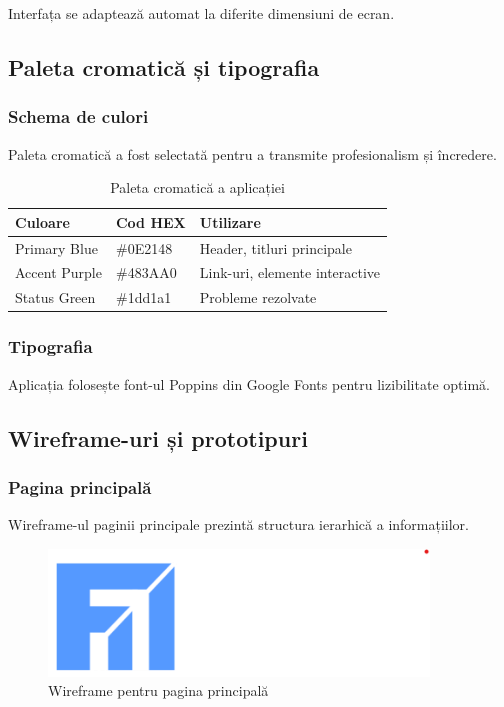 \documentclass[12pt,a4paper]{report}
\begin{document}
Interfața se adaptează automat la diferite dimensiuni de ecran.

\subsection{Paleta cromatică și tipografia}

\subsubsection{Schema de culori}

Paleta cromatică a fost selectată pentru a transmite profesionalism și încredere.

\begin{table}[H]
\centering
\caption{Paleta cromatică a aplicației}
\label{tab:paleta_culori}
\begin{tabular}{|l|l|p{6cm}|}
\hline
\textbf{Culoare} & \textbf{Cod HEX} & \textbf{Utilizare} \\
\hline
Primary Blue & \#0E2148 & Header, titluri principale \\
\hline
Accent Purple & \#483AA0 & Link-uri, elemente interactive \\
\hline
Status Green & \#1dd1a1 & Probleme rezolvate \\
\hline
\end{tabular}
\end{table}

\subsubsection{Tipografia}

Aplicația folosește font-ul Poppins din Google Fonts pentru lizibilitate optimă.

\subsection{Wireframe-uri și prototipuri}

\subsubsection{Pagina principală}

Wireframe-ul paginii principale prezintă structura ierarhică a informațiilor.

\begin{figure}[H]
\centering
\includegraphics[width=0.9\textwidth]{logo_uaic.png}
\caption{Wireframe pentru pagina principală}
\label{fig:wireframe_home}
\end{figure}
\end{document}
